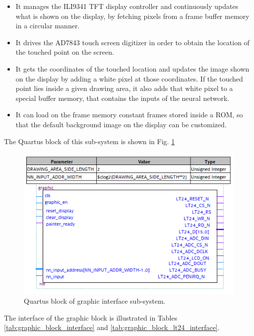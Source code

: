 \documentclass[11pt]{report}
\begin{document}
\begin{itemize}
    \item It manages the ILI9341 TFT display controller and continuously updates what is shown on the display, by fetching pixels from a frame buffer memory in a circular manner.
    \item It drives the AD7843 touch screen digitizer in order to obtain the location of the touched point on the screen.
    \item It gets the coordinates of the touched location and updates the image shown on the display by adding a white pixel at those coordinates. If the touched point lies inside a given drawing area, it also adds that white pixel to a special buffer memory, that contains the inputs of the neural network.
    \item It can load on the frame memory constant frames stored inside a ROM, so that the default background image on the display can be customized.
\end{itemize}

The Quartus block of this sub-system is shown in Fig. \ref{fig:graphic_block}

\begin{figure}[!h]
    \centering
    \includegraphics[width=0.6\linewidth]{images/graphic_interface_design/graphic_interface_block.png}
    \caption{Quartus block of graphic interface sub-system.}
    \label{fig:graphic_block}
\end{figure}

The interface of the graphic block is illustrated in Tables \ref{tab:graphic_block_interface} and \ref{tab:graphic_block_lt24_interface}.
\end{document}

